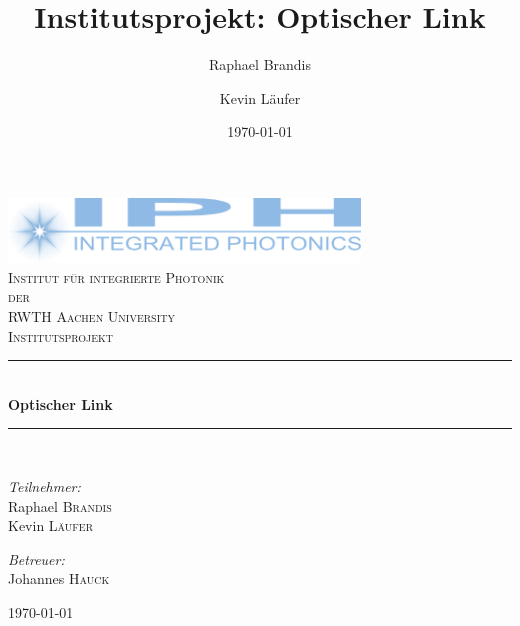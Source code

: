 \documentclass[12pt,a4paper]{article}
\title{Institutsprojekt: Optischer Link}
\author{Raphael Brandis \and Kevin Läufer}
\date{\today}
\begin{document}
\begin{titlepage}
\begin{center}

\includegraphics[width=0.7\textwidth]{../iph_logo.png}~\\[1cm]

\textsc{\LARGE Institut für integrierte Photonik}\\[0.5cm]

\textsc{\Large der}\\[0.5cm]

\textsc{\LARGE RWTH Aachen University}\\[1.5cm]


\textsc{\Large Institutsprojekt}\\[0.5cm]

\rule{\linewidth}{0.5mm} \\[0.4cm]
{ \huge \bfseries Optischer Link \\[0.4cm] }

\rule{\linewidth}{0.5mm} \\[1.5cm]

\begin{minipage}[t]{0.4\textwidth}
\vspace{0pt}
\begin{flushleft} \large
\emph{Teilnehmer:}\\
Raphael \textsc{Brandis}\\
Kevin \textsc{Läufer}
\end{flushleft}
\end{minipage}
\hfill
\begin{minipage}[t]{0.4\textwidth}
\vspace{0pt}
\begin{flushright} \large
\emph{Betreuer:} \\
Johannes \textsc{Hauck}
\end{flushright}
\end{minipage}

\vfill

{\large \today}

\end{center}
\end{titlepage}
\end{document}
